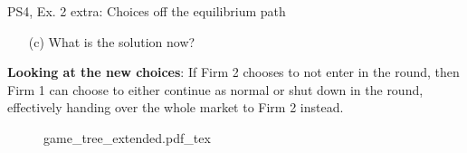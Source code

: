 \begin{frame}{PS4, Ex. 2 extra: Choices off the equilibrium path}
  \begin{multicols}{2}
    \begin{itemize}
      \item[(c)] What is the solution now?
    \end{itemize}
    \textbf{Looking at the new choices}: If Firm 2 chooses to not enter in the  round, then Firm 1 can choose to either continue as normal or shut down in the  round, effectively handing over the whole market to Firm 2 instead.
  \vfill\null \columnbreak
    \begin{figure}[!h]
      \begin{center}
      \def\svgwidth{1.0\columnwidth}
      {game_tree_extended.pdf_tex}
      \end{center}
    \end{figure}
  \vfill\null
  \end{multicols}
\end{frame}
